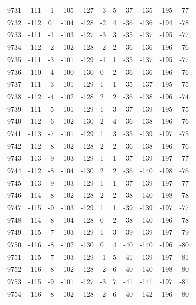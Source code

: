\begin{table}[H]
\begin{tabular}{lllllllllll}
9731 & -111 & -1 & -105 & -127 & -3 & 5 & -37 & -135 & -195 & -77 \\
9732 & -112 & 0 & -104 & -128 & -2 & 4 & -36 & -136 & -194 & -78 \\
9733 & -111 & -1 & -103 & -127 & -3 & 3 & -35 & -137 & -195 & -77 \\
9734 & -112 & -2 & -102 & -128 & -2 & 2 & -36 & -136 & -196 & -76 \\
9735 & -111 & -3 & -101 & -129 & -1 & 1 & -35 & -137 & -195 & -77 \\
9736 & -110 & -4 & -100 & -130 & 0 & 2 & -36 & -136 & -196 & -76 \\
9737 & -111 & -3 & -101 & -129 & 1 & 1 & -35 & -137 & -195 & -75 \\
9738 & -112 & -4 & -102 & -128 & 2 & 2 & -36 & -138 & -196 & -74 \\
9739 & -111 & -5 & -101 & -129 & 1 & 3 & -37 & -139 & -195 & -75 \\
9740 & -112 & -6 & -102 & -130 & 2 & 4 & -36 & -138 & -196 & -76 \\
9741 & -113 & -7 & -101 & -129 & 1 & 3 & -35 & -139 & -197 & -75 \\
9742 & -112 & -8 & -102 & -128 & 2 & 2 & -36 & -138 & -196 & -76 \\
9743 & -113 & -9 & -103 & -129 & 1 & 1 & -37 & -139 & -197 & -77 \\
9744 & -112 & -8 & -104 & -130 & 2 & 2 & -36 & -140 & -198 & -76 \\
9745 & -113 & -9 & -103 & -129 & 1 & 1 & -37 & -139 & -197 & -77 \\
9746 & -114 & -8 & -102 & -128 & 2 & 2 & -38 & -140 & -198 & -78 \\
9747 & -115 & -9 & -103 & -129 & 1 & 1 & -39 & -139 & -197 & -77 \\
9748 & -114 & -8 & -104 & -128 & 0 & 2 & -38 & -140 & -196 & -78 \\
9749 & -115 & -7 & -103 & -129 & 1 & 3 & -39 & -139 & -197 & -79 \\
9750 & -116 & -8 & -102 & -130 & 0 & 4 & -40 & -140 & -196 & -80 \\
9751 & -115 & -7 & -103 & -129 & -1 & 5 & -41 & -139 & -197 & -81 \\
9752 & -116 & -8 & -102 & -128 & -2 & 6 & -40 & -140 & -198 & -80 \\
9753 & -115 & -9 & -101 & -127 & -3 & 7 & -41 & -141 & -197 & -81 \\
9754 & -116 & -8 & -102 & -128 & -2 & 6 & -40 & -142 & -196 & -80 \\

\end{tabular}
\end{table}
